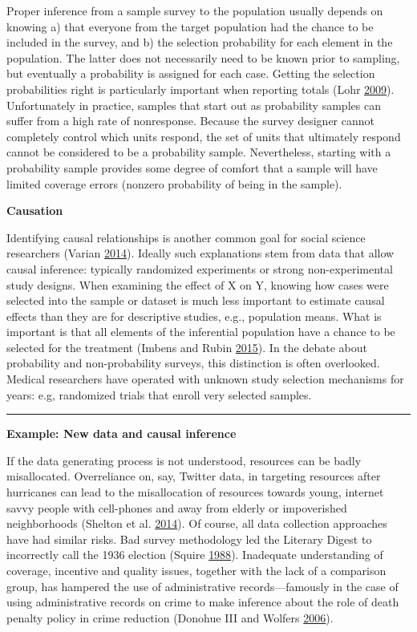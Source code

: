 \documentclass[]{krantz}
\begin{document}
Proper inference from a sample survey to the population usually depends
on knowing a) that everyone from the target population had the chance to
be included in the survey, and b) the selection probability for each
element in the population. The latter does not necessarily need to be
known prior to sampling, but eventually a probability is assigned for
each case. Getting the selection probabilities right is particularly
important when reporting totals (Lohr
\protect\hyperlink{ref-lohr2009sampling}{2009}). Unfortunately in
practice, samples that start out as probability samples can suffer from
a high rate of nonresponse. Because the survey designer cannot
completely control which units respond, the set of units that ultimately
respond cannot be considered to be a probability sample. Nevertheless,
starting with a probability sample provides some degree of comfort that
a sample will have limited coverage errors (nonzero probability of being
in the sample).

\textbf{Causation}

Identifying causal relationships is another common goal for social
science researchers (Varian
\protect\hyperlink{ref-varian2014big}{2014}). Ideally such explanations
stem from data that allow causal inference: typically randomized
experiments or strong non-experimental study designs. When examining the
effect of X on Y, knowing how cases were selected into the sample or
dataset is much less important to estimate causal effects than they are
for descriptive studies, e.g., population means. What is important is
that all elements of the inferential population have a chance to be
selected for the treatment (Imbens and Rubin
\protect\hyperlink{ref-imbens2015causal}{2015}). In the debate about
probability and non-probability surveys, this distinction is often
overlooked. Medical researchers have operated with unknown study
selection mechanisms for years: e.g, randomized trials that enroll very
selected samples.

\begin{center}\rule{0.5\linewidth}{\linethickness}\end{center}

\textbf{Example: New data and causal inference}

If the data generating process is not understood, resources can be badly
misallocated. Overreliance on, say, Twitter data, in targeting resources
after hurricanes can lead to the misallocation of resources towards
young, internet savvy people with cell-phones and away from elderly or
impoverished neighborhoods (Shelton et al.
\protect\hyperlink{ref-shelton2014mapping}{2014}). Of course, all data
collection approaches have had similar risks. Bad survey methodology led
the Literary Digest to incorrectly call the 1936 election (Squire
\protect\hyperlink{ref-squire19881936}{1988}). Inadequate understanding
of coverage, incentive and quality issues, together with the lack of a
comparison group, has hampered the use of administrative
records---famously in the case of using administrative records on crime
to make inference about the role of death penalty policy in crime
reduction (Donohue III and Wolfers
\protect\hyperlink{ref-donohue2006uses}{2006}).
\end{document}
